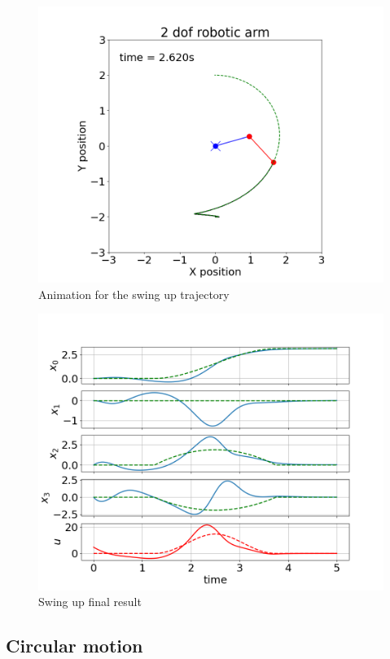 \begin{figure}[H]
    \centering
    \includegraphics[width=0.8\linewidth]{figs/swing_video.png}
    \caption{Animation for the swing up trajectory}
    \label{fig:swing_video}
\end{figure}

\begin{figure}[H]
    \centering
    \includegraphics[width=0.8\linewidth]{figs/swing_result.png}
    \caption{Swing up final result}
    \label{fig:swing_result}
\end{figure}

\subsection*{Circular motion}

